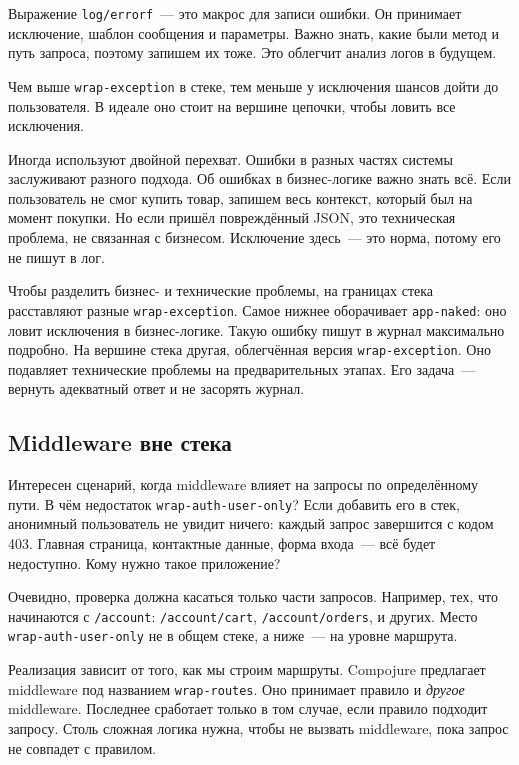 \fi


Выражение \verb|log/errorf|~--- это макрос для записи ошибки. Он принимает
исключение, шаблон сообщения и параметры. Важно знать, какие были метод и путь
запроса, поэтому запишем их тоже. Это облегчит анализ логов в будущем.

Чем выше \verb|wrap-exception| в стеке, тем меньше у исключения шансов дойти
до пользователя. В идеале оно стоит на вершине цепочки, чтобы ловить все
исключения.

Иногда используют двойной перехват. Ошибки в разных частях системы заслуживают
разного подхода. Об ошибках в бизнес-логике важно знать всё. Если
пользователь не смог купить товар, запишем весь контекст, который был на момент
покупки. Но если пришёл повреждённый JSON, это техническая проблема, не
связанная с бизнесом. Исключение здесь~--- это норма, потому его не пишут в лог.

Чтобы разделить бизнес- и технические проблемы, на границах стека расставляют
разные \verb|wrap-exception|. Самое нижнее оборачивает \verb|app-naked|: оно
ловит исключения в бизнес-логике. Такую ошибку пишут в журнал максимально
подробно. На вершине стека другая, облегчённая версия \verb|wrap-exception|.
Оно подавляет технические проблемы на предварительных этапах. Его задача~--- вернуть
адекватный ответ и не засорять журнал.

\subsection{Middleware вне стека}


Интересен сценарий, когда middleware влияет на запросы по определённому пути. В
чём недостаток \verb|wrap-auth-user-only|? Если добавить его в стек, анонимный
пользователь не увидит ничего: каждый запрос завершится с кодом 403. Главная
страница, контактные данные, форма входа~--- всё будет недоступно. Кому
нужно такое приложение?

\mnoindent
Очевидно, проверка должна касаться только части запросов. Например, тех, что
начинаются с \verb|/account|: \verb|/account/cart|, \verb|/account/orders|,
и других. Место \verb|wrap-auth-user-only| не в общем стеке, а ниже~--- на
уровне маршрута.

Реализация зависит от того, как мы строим маршруты. Compojure предлагает
middleware под названием \verb|wrap-routes|. Оно принимает правило и
\emph{другое} middleware. Последнее сработает только в том случае, если правило
подходит запросу. Столь сложная логика нужна, чтобы не вызвать middleware, пока
запрос не совпадет с правилом.

